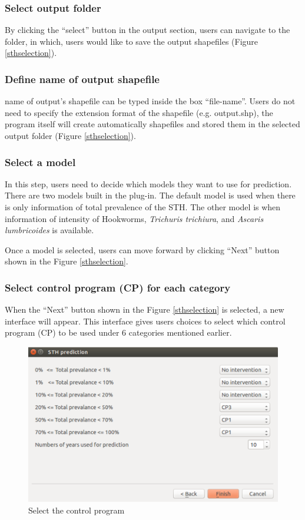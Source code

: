 \documentclass[12pt,oneside]{memoir}
\begin{document}
\subsubsection{Select output folder}
By clicking the ``select'' button in the output section, users can navigate to the folder, in which, users would like to save the output shapefiles (Figure \ref{sthselection}).

\subsubsection{Define name of output shapefile}
name of output's shapefile can be typed inside the box ``file-name''. Users do not need to specify the extension format of the shapefile (e.g. output.shp), the program itself will create automatically shapefiles and stored them in the selected output folder (Figure \ref{sthselection}). 
\subsubsection{Select a model}
In this step, users need to decide which models they want to use for prediction. There are two models built in the plug-in. The default model is used when there is only information of total prevalence of the STH. The other model is when information of intensity of  Hookworms, \textit{Trichuris trichiura}, and \textit{Ascaris lumbricoides} is available. 

Once a model is selected, users can move forward by clicking ``Next'' button shown in the Figure \ref{sthselection}.
\subsubsection{Select control program (CP) for each category}
When the ``Next'' button shown in the Figure \ref{sthselection} is selected, a new interface will appear. This interface gives users choices to select which control program (CP) to be used under 6 categories mentioned earlier. 

\begin{figure}[H]
\centering
\includegraphics[scale=0.5]{cpselection} 
\caption{Select the control program} 
\label{cpselection}
\end{figure}
\end{document}
